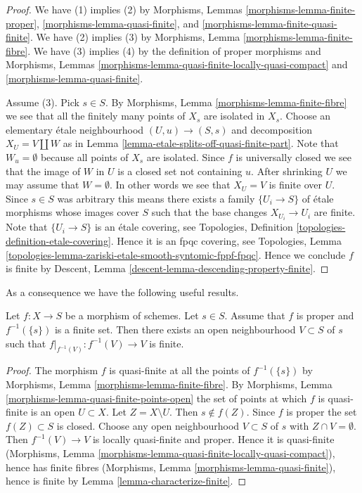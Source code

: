 \begin{proof}
We have (1) implies (2) by
Morphisms, Lemmas \ref{morphisms-lemma-finite-proper},
\ref{morphisms-lemma-quasi-finite},
and \ref{morphisms-lemma-finite-quasi-finite}.
We have (2) implies (3) by Morphisms, Lemma \ref{morphisms-lemma-finite-fibre}.
We have (3) implies (4) by the definition of proper morphisms and
Morphisms, Lemmas \ref{morphisms-lemma-quasi-finite-locally-quasi-compact} and
\ref{morphisms-lemma-quasi-finite}.

\medskip\noindent
Assume (3). Pick $s \in S$. By
Morphisms, Lemma \ref{morphisms-lemma-finite-fibre} we
see that all the finitely many points of $X_s$ are isolated in $X_s$.
Choose an elementary \'etale neighbourhood $(U, u) \to (S, s)$
and decomposition $X_U = V \amalg W$ as in
Lemma \ref{lemma-etale-splits-off-quasi-finite-part}.
Note that $W_u = \emptyset$ because all points of $X_s$ are isolated.
Since $f$ is universally closed we see that
the image of $W$ in $U$ is a closed set not containing $u$.
After shrinking $U$ we may assume that $W = \emptyset$.
In other words we see that $X_U = V$ is finite over $U$.
Since $s \in S$ was arbitrary
this means there exists a family $\{U_i \to S\}$
of \'etale morphisms whose images cover $S$ such that
the base changes $X_{U_i} \to U_i$ are finite.
Note that $\{U_i \to S\}$ is an \'etale covering,
see Topologies, Definition \ref{topologies-definition-etale-covering}.
Hence it is an fpqc covering, see
Topologies,
Lemma \ref{topologies-lemma-zariski-etale-smooth-syntomic-fppf-fpqc}.
Hence we conclude $f$ is finite by
Descent, Lemma \ref{descent-lemma-descending-property-finite}.
\end{proof}

\noindent
As a consequence we have the following useful results.

\begin{lemma}
\label{lemma-proper-finite-fibre-finite-in-neighbourhood}
Let $f : X \to S$ be a morphism of schemes.
Let $s \in S$.
Assume that $f$ is proper and $f^{-1}(\{s\})$ is a finite set.
Then there exists an open neighbourhood $V \subset S$ of $s$
such that $f|_{f^{-1}(V)} : f^{-1}(V) \to V$ is finite.
\end{lemma}

\begin{proof}
The morphism $f$ is quasi-finite at all the points of $f^{-1}(\{s\})$
by Morphisms, Lemma \ref{morphisms-lemma-finite-fibre}.
By Morphisms, Lemma \ref{morphisms-lemma-quasi-finite-points-open} the
set of points at which $f$ is quasi-finite is an open $U \subset X$.
Let $Z = X \setminus U$. Then $s \not \in f(Z)$. Since $f$ is proper
the set $f(Z) \subset S$ is closed. Choose any open neighbourhood
$V \subset S$ of $s$ with $Z \cap V = \emptyset$. Then
$f^{-1}(V) \to V$ is locally quasi-finite and proper.
Hence it is quasi-finite
(Morphisms, Lemma \ref{morphisms-lemma-quasi-finite-locally-quasi-compact}),
hence has finite fibres
(Morphisms, Lemma \ref{morphisms-lemma-quasi-finite}), hence
is finite by Lemma \ref{lemma-characterize-finite}.
\end{proof}

